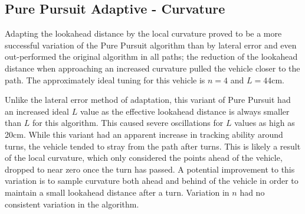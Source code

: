 \documentclass[12pt]{article}
\begin{document}
\begin{flushleft}
\begin{figure}[H]
\endminipage
\end{figure}

\subsection{Pure Pursuit Adaptive - Curvature}

Adapting the lookahead distance by the local curvature proved to be a more successful variation of the Pure Pursuit algorithm than by lateral error and even out-performed the original algorithm in all paths; the reduction of the lookahead distance when approaching an increased curvature pulled the vehicle closer to the path. The approximately ideal tuning for this vehicle is $n=4$ and $L=44$cm.

Unlike the lateral error method of adaptation, this variant of Pure Pursuit had an increased ideal $L$ value as the effective lookahead distance is always smaller than $L$ for this algorithm. This caused severe oscillations for $L$ values as high as 20cm. While this variant had an apparent increase in tracking ability around turns, the vehicle tended to stray from the path after turns. This is likely a result of the local curvature, which only considered the points ahead of the vehicle, dropped to near zero once the turn has passed. A potential improvement to this variation is to sample curvature both ahead and behind of the vehicle in order to maintain a small lookahead distance after a turn. Variation in $n$ had no consistent variation in the algorithm.


\end{flushleft}
\end{document}
